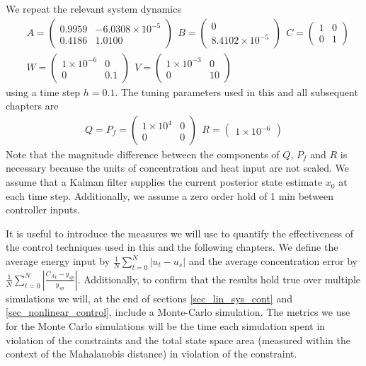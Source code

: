 We repeat the relevant system dynamics  
\begin{equation}
\begin{aligned}
&A = \begin{pmatrix}
0.9959 & -6.0308\times 10^{-5} \\
0.4186 & 1.0100
\end{pmatrix}
~~B = \begin{pmatrix}
0 \\ 8.4102\times 10^{-5}
\end{pmatrix} ~~
C = \begin{pmatrix}
1 & 0 \\ 0 & 1
\end{pmatrix} \\
&W = \begin{pmatrix}
1\times 10^{-6} & 0 \\ 0 & 0.1
\end{pmatrix} ~~
V = \begin{pmatrix}
1\times 10^{-3} & 0 \\ 0 & 10
\end{pmatrix}
\end{aligned}
\label{eq_linmod_params}
\end{equation}
using a time step $h=0.1$. The tuning parameters used in this and all subsequent chapters are 
\begin{equation}
\begin{aligned}
Q = P_f = \begin{pmatrix}
1\times 10^{4} & 0 \\ 0 & 0
\end{pmatrix} 
~~R = \begin{pmatrix}
1\times 10^{-6}
\end{pmatrix}
\end{aligned}
\label{eq_mpc_tuning}
\end{equation}
Note that the magnitude difference between the components of $Q$, $P_f$ and $R$ is necessary because the units of concentration and heat input are not scaled. We assume that a Kalman filter supplies the current posterior state estimate $x_0$ at each time step. Additionally, we assume a zero order hold of 1 min between controller inputs.

It is useful to introduce the measures we will use to quantify the effectiveness of the control techniques used in this and the following chapters. We define the average energy input by $\frac{1}{N}\sum^N_{t=0}|u_t-u_s|$ and the average concentration error by $\frac{1}{N}\sum^N_{t=0}|\frac{{C_A}_t-y_{sp}}{y_{sp}}|$. Additionally, to confirm that the results hold true over multiple simulations we will, at the end of sections \ref{sec_lin_sys_cont} and \ref{sec_nonlinear_control}, include a Monte-Carlo simulation. The metrics we use for the Monte Carlo simulations will be the time each simulation spent in violation of the constraints and the total state space area (measured within the context of the Mahalanobis distance) in violation of the constraint.  

